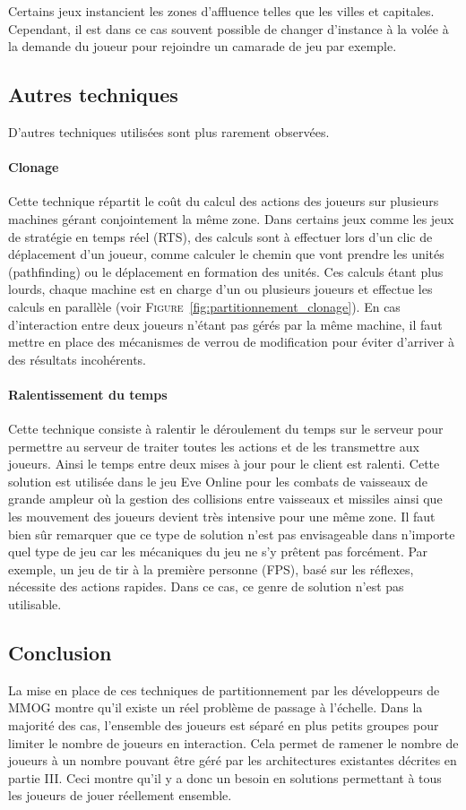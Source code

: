 Certains jeux instancient les zones d'affluence telles que les villes et capitales. Cependant, il est dans ce cas souvent possible de changer d'instance à la volée à la demande du joueur pour rejoindre un camarade de jeu par exemple.

\subsection{Autres techniques}
D'autres techniques utilisées sont plus rarement observées.
\paragraph{Clonage\\}
Cette technique répartit le coût du calcul des actions des joueurs sur plusieurs machines gérant conjointement la même zone. Dans certains jeux comme les jeux de stratégie en temps réel (RTS), des calculs sont à effectuer lors d'un clic de déplacement d'un joueur, comme calculer le chemin que vont prendre les unités (pathfinding) ou le déplacement en formation des unités. Ces calculs étant plus lourds, chaque machine est en charge d'un ou plusieurs joueurs et effectue les calculs en parallèle (voir \textsc{Figure}~\ref{fig:partitionnement_clonage}). En cas d'interaction entre deux joueurs n'étant pas gérés par la même machine, il faut mettre en place des mécanismes de verrou de modification pour éviter d'arriver à des résultats incohérents.
\paragraph{Ralentissement du temps\\}
Cette technique consiste à ralentir le déroulement du temps sur le serveur pour permettre au serveur de traiter toutes les actions et de les transmettre aux joueurs. Ainsi le temps entre deux mises à jour pour le client est ralenti. Cette solution est utilisée dans le jeu Eve Online pour les combats de vaisseaux de grande ampleur où la gestion des collisions entre vaisseaux et missiles ainsi que les mouvement des joueurs devient très intensive pour une même zone. Il faut bien sûr remarquer que ce type de solution n'est pas envisageable dans n'importe quel type de jeu car les mécaniques du jeu ne s'y prêtent pas forcément. Par exemple, un jeu de tir à la première personne (FPS), basé sur les réflexes, nécessite des actions rapides. Dans ce cas, ce genre de solution n'est pas utilisable.

\subsection{Conclusion}
La mise en place de ces techniques de partitionnement par les développeurs de MMOG montre qu'il existe un réel problème de passage à l'échelle. Dans la majorité des cas, l'ensemble des joueurs est séparé en plus petits groupes pour limiter le nombre de joueurs en interaction. Cela permet de ramener le nombre de joueurs à un nombre pouvant être géré par les architectures existantes décrites en partie III. Ceci montre qu'il y a donc un besoin en solutions permettant à tous les joueurs de jouer réellement ensemble.
